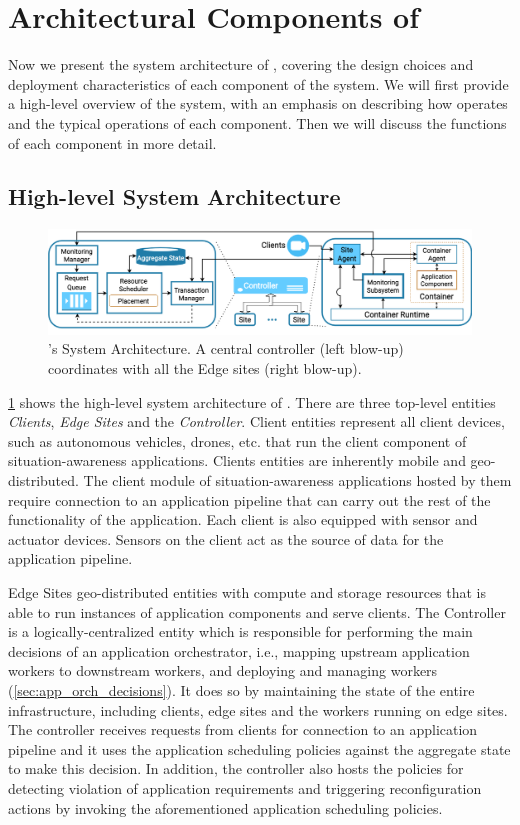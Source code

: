 \section{Architectural Components of \oneedge{}}
\label{sec:oneedge_arch}
Now we present the system architecture of \oneedge{}, covering the design choices and deployment characteristics of each component of the system. We will first provide a high-level overview of the system, with an emphasis on describing how \oneedge{} operates and the typical operations of each component. Then we will discuss the functions of each component in more detail.

\subsection{High-level System Architecture}
\begin{figure}[t]
\centering
\includegraphics[width=0.85\columnwidth]{figures/oneedge/onefog_overview.png}
\caption{\oneedge{}'s System Architecture. A central controller (left blow-up) coordinates with all the Edge sites (right blow-up).}
\label{fig:system_arch}
\vspace{-2mm}
\end{figure}
\cref{fig:system_arch} shows the high-level system architecture of \oneedge{}. There are three top-level entities \textit{Clients}, \textit{Edge Sites} and the \textit{Controller}. 
Client entities represent all client devices, such as autonomous vehicles, drones, etc. that run the client component of situation-awareness applications. Clients entities are inherently mobile and geo-distributed. The client module of situation-awareness applications hosted by them require connection to an application pipeline that can carry out the rest of the functionality of the application. Each client is also equipped with sensor and actuator devices. Sensors on the client act as the source of data for the application pipeline. 
\par Edge Sites geo-distributed entities with compute and storage resources that is able to run instances of application components and serve clients. The Controller is a logically-centralized entity which is responsible for performing the main decisions of an application orchestrator, i.e., mapping upstream application workers to downstream workers, and deploying and managing workers (\cref{sec:app_orch_decisions}). It does so by maintaining the state of the entire infrastructure, including clients, edge sites and the workers running on edge sites. The controller receives requests from clients for connection to an application pipeline and it uses the application scheduling policies against the aggregate state to make this decision. In addition, the controller also hosts the policies for detecting violation of application requirements and triggering reconfiguration actions by invoking the aforementioned application scheduling policies.

